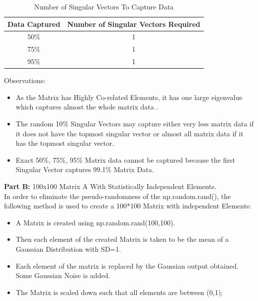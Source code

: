 \documentclass[a4 paper]{article}
\begin{document}
\begin{table}[h!]
\centering
 \begin{tabular}{|c|c|} 
 \hline
Data Captured  & Number of Singular Vectors Required\\ [0.5ex] 
\hline
50\% &  1\\
75\% &  1\\
95\% &  1\\
\hline
\end{tabular}
\caption{Number of Singular Vectors To Capture Data}
\end{table}
\newpage
{} Observations:
\begin{itemize}
  \item As the Matrix has Highly Co-related Elements, it has one large eigenvalue which captures almost the whole matrix data .
  \item The random 10\% Singular Vectors may capture either very less matrix data if it does not have the topmost singular vector or almost all matrix data if it has the topmost singular vector.
  \item Exact 50\%, 75\%, 95\%  Matrix data cannot be captured because the first Singular Vector captures 99.1\% Matrix Data.  
\end{itemize}
\bigskip
\textbf{Part B:} 100x100 Matrix A With Statistically Independent Elements.\\

In order to eliminate the pseudo-randomness of the np.random.rand(), the following method is used to create a 100*100 Matrix with independent Elements:
\begin{itemize}
    \item A Matrix is created using np.random.rand(100,100).
    \item Then each element of the created Matrix is taken to be the mean of a Gaussian Distribution with SD=1.
    \item Each element of the matrix is replaced by the Gaussian output obtained. Some Gaussian Noise is added.
    \item The Matrix is scaled down such that all elements are between (0,1);
\end{itemize}
  
\end{document}
